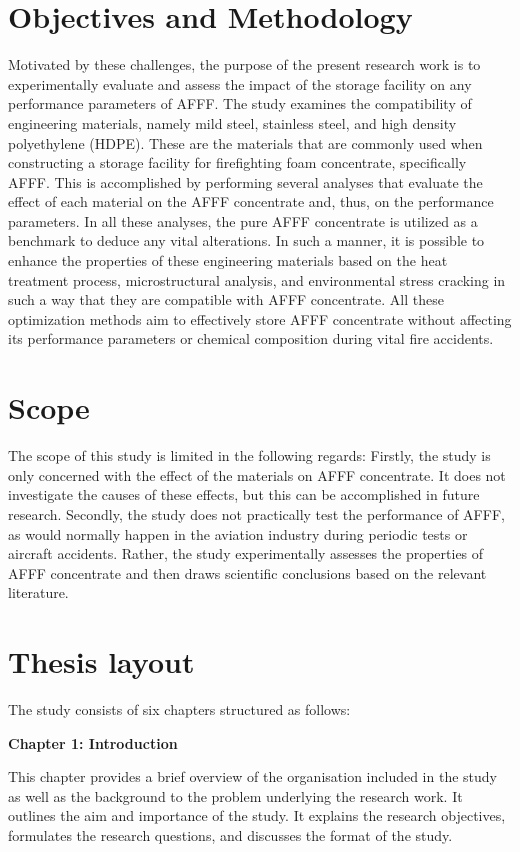\section{Objectives and Methodology}
Motivated by these challenges, the purpose of the present research work is to experimentally evaluate and assess the impact of the storage facility on any performance parameters of AFFF. The study examines the compatibility of engineering materials, namely mild steel, stainless steel, and high density polyethylene (HDPE). These are the materials that are commonly used when constructing a storage facility for firefighting foam concentrate, specifically AFFF. This is accomplished by performing several analyses that evaluate the effect of each material on the AFFF concentrate and, thus, on the performance parameters. In all these analyses, the pure AFFF concentrate is utilized as a benchmark to deduce any vital alterations. In such a manner, it is possible to enhance the properties of these engineering materials based on the heat treatment process, microstructural analysis, and environmental stress cracking in such a way that they are compatible with AFFF concentrate. All these optimization methods aim to effectively store AFFF concentrate without affecting its performance parameters or chemical composition during vital fire accidents.

\section{Scope}
The scope of this study is limited in the following regards: Firstly, the study is only concerned with the effect of the materials on AFFF concentrate. It does not investigate the causes of these effects, but this can be accomplished in future research. Secondly, the study does not practically test the performance of AFFF, as would normally happen in the aviation industry during periodic tests or aircraft accidents. Rather, the study experimentally assesses the properties of AFFF concentrate and then draws scientific conclusions based on the relevant literature.

\section{Thesis layout}
The study consists of six chapters structured as follows:

\textbf{Chapter 1: Introduction}

This chapter provides a brief overview of the organisation included in the study as well as the background to the problem underlying the research work. It outlines the aim and importance of the study. It explains the research objectives, formulates the research questions, and discusses the format of the study.


